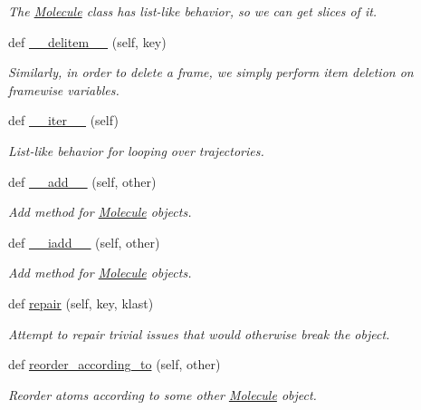 \begin{DoxyCompactItemize}
\begin{DoxyCompactList}\small\item\em The \hyperlink{classsrc_1_1molecule_1_1Molecule}{Molecule} class has list-\/like behavior, so we can get slices of it. \end{DoxyCompactList}\item 
def \hyperlink{classsrc_1_1molecule_1_1Molecule_a31014aa4ca1b8259557bedd6d13a51aa}{\+\_\+\+\_\+delitem\+\_\+\+\_\+} (self, key)
\begin{DoxyCompactList}\small\item\em Similarly, in order to delete a frame, we simply perform item deletion on framewise variables. \end{DoxyCompactList}\item 
def \hyperlink{classsrc_1_1molecule_1_1Molecule_a05079753fc6897507fa02eb4ef57fc77}{\+\_\+\+\_\+iter\+\_\+\+\_\+} (self)
\begin{DoxyCompactList}\small\item\em List-\/like behavior for looping over trajectories. \end{DoxyCompactList}\item 
def \hyperlink{classsrc_1_1molecule_1_1Molecule_a087212040303a4f62a3462106428cc38}{\+\_\+\+\_\+add\+\_\+\+\_\+} (self, other)
\begin{DoxyCompactList}\small\item\em Add method for \hyperlink{classsrc_1_1molecule_1_1Molecule}{Molecule} objects. \end{DoxyCompactList}\item 
def \hyperlink{classsrc_1_1molecule_1_1Molecule_a4a1e6648a99afd550e7b24db3a2b249b}{\+\_\+\+\_\+iadd\+\_\+\+\_\+} (self, other)
\begin{DoxyCompactList}\small\item\em Add method for \hyperlink{classsrc_1_1molecule_1_1Molecule}{Molecule} objects. \end{DoxyCompactList}\item 
def \hyperlink{classsrc_1_1molecule_1_1Molecule_aaf70e66c397fd1e77644339ec81dfa9e}{repair} (self, key, klast)
\begin{DoxyCompactList}\small\item\em Attempt to repair trivial issues that would otherwise break the object. \end{DoxyCompactList}\item 
def \hyperlink{classsrc_1_1molecule_1_1Molecule_a16dcb06bf37392ef659cc156e0b61688}{reorder\+\_\+according\+\_\+to} (self, other)
\begin{DoxyCompactList}\small\item\em Reorder atoms according to some other \hyperlink{classsrc_1_1molecule_1_1Molecule}{Molecule} object. \end{DoxyCompactList}\item 

\end{DoxyCompactItemize}

